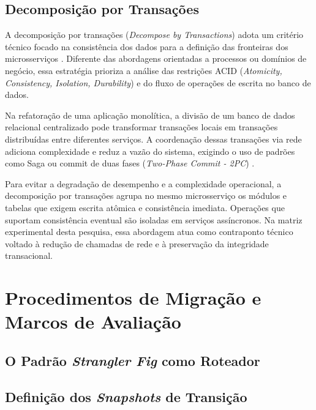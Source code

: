 \subsection{Decomposição por Transações}

A decomposição por transações (\textit{Decompose by Transactions}) adota um critério técnico focado na consistência dos dados para a definição das fronteiras dos microsserviços \cite{richardson2018}. Diferente das abordagens orientadas a processos ou domínios de negócio, essa estratégia prioriza a análise das restrições ACID (\textit{Atomicity, Consistency, Isolation, Durability}) e do fluxo de operações de escrita no banco de dados.

Na refatoração de uma aplicação monolítica, a divisão de um banco de dados relacional centralizado pode transformar transações locais em transações distribuídas entre diferentes serviços. A coordenação dessas transações via rede adiciona complexidade e reduz a vazão do sistema, exigindo o uso de padrões como Saga ou commit de duas fases (\textit{Two-Phase Commit - 2PC}) \cite{richardson2018, newman2021}.

Para evitar a degradação de desempenho e a complexidade operacional, a decomposição por transações agrupa no mesmo microsserviço os módulos e tabelas que exigem escrita atômica e consistência imediata. Operações que suportam consistência eventual são isoladas em serviços assíncronos. Na matriz experimental desta pesquisa, essa abordagem atua como contraponto técnico voltado à redução de chamadas de rede e à preservação da integridade transacional.

\section{Procedimentos de Migração e Marcos de Avaliação}
\label{sec:procedimentos_snapshots}

\subsection{O Padrão \textit{Strangler Fig} como Roteador}

\subsection{Definição dos \textit{Snapshots} de Transição}


